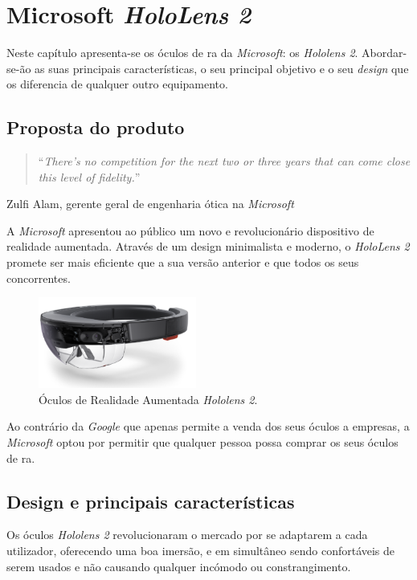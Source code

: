 \documentclass{report}
\begin{document}
\chapter{Microsoft \textit{HoloLens 2}}
\label{chap.microsoft-hololens-2}
Neste capítulo apresenta-se os óculos de \ac{ra} da \textit{Microsoft}: os \textit{Hololens 2}. Abordar-se-ão as suas principais características, o seu principal objetivo e o seu \textit{design} que os diferencia de qualquer outro equipamento.

\section{Proposta do produto}
\begin{quote}
    ``\emph{There’s no competition for the next two or three years that can come close this level of fidelity.}''\cite{bohn_2019}
\end{quote}
\begin{flushright}
    Zulfi Alam, gerente geral de engenharia ótica na \textit{Microsoft}
\end{flushright}

A \textit{Microsoft} apresentou ao público um novo e revolucionário dispositivo de realidade aumentada. Através de um design minimalista e moderno, o \textit{HoloLens 2} promete ser mais eficiente que a sua versão anterior e que todos os seus concorrentes.

\begin{figure}[H]
    \centering
    \includegraphics[width=14em]{hololens2.png}
    \caption{Óculos de Realidade Aumentada \textit{Hololens 2}.}
    \label{Fig:hololens2}
\end{figure}


Ao contrário da \textit{Google} que apenas permite a venda dos seus óculos a empresas, a \textit{Microsoft} optou por permitir que qualquer pessoa possa comprar os seus óculos de \ac{ra}.

\section{Design e principais características}
Os óculos \textit{Hololens 2} revolucionaram o mercado por se adaptarem a cada utilizador, oferecendo uma boa imersão, e em simultâneo sendo confortáveis de serem usados e não causando qualquer incómodo ou constrangimento.
\end{document}
